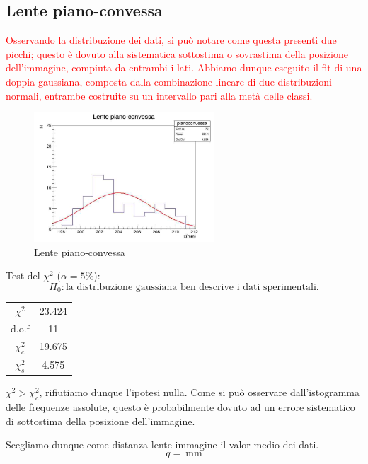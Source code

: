 \documentclass[a4paper]{article}
\begin{document}
    \subsection{Lente piano-convessa}
    \textcolor{red}{Osservando la distribuzione dei dati, si può notare come questa presenti due picchi; questo è dovuto alla sistematica sottostima o sovrastima della posizione dell'immagine, compiuta da entrambi i lati. Abbiamo dunque eseguito il fit di una doppia gaussiana, composta dalla combinazione lineare di due distribuzioni normali, entrambe costruite su un intervallo pari alla metà delle classi.}
    \begin{figure}[H]
    	\centering
    	\includegraphics[width=0.6\textwidth]{histo3.jpg}
    	\caption{Lente piano-convessa}
    	\label{fig:piano-convessa}
    \end{figure}
    Test del $\chi^2$ ($\alpha=5\%$):
     \[
    H_0: \text{la distribuzione gaussiana ben descrive i dati sperimentali.}
    \]
    \begin{table}[H]
    	\centering
    	\begin{tabular}{|c|c|}
    		\hline
    		$\chi^2$ & 23.424 \\
    		d.o.f & 11 \\
    		$\chi^2_c$ & 19.675 \\
    		$\chi^2_s$ & 4.575 \\ \hline
    	\end{tabular}
    	\label{tab:chi-quadro-piano-convessa}
    \end{table}
    $\chi^2>\chi^2_c$, rifiutiamo dunque l'ipotesi nulla. Come si può osservare dall'istogramma delle frequenze assolute, questo è probabilmente dovuto ad un errore sistematico di sottostima della posizione dell'immagine.
    
    Scegliamo dunque come distanza lente-immagine il valor medio dei dati.
    \[
    q=\SI{}{\mm}
    \]
\end{document}
